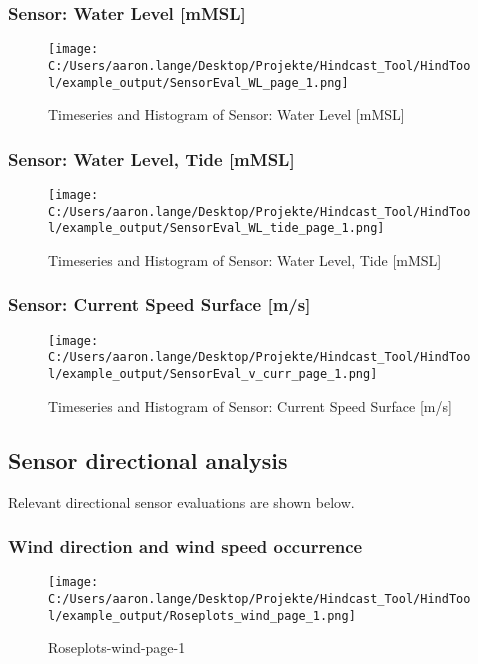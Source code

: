 \subsubsection{Sensor: Water Level [mMSL]} 
\begin{figure}[H] 
 \centering 
 \texttt{[image: C:/Users/aaron.lange/Desktop/Projekte/Hindcast\_Tool/HindTool/example\_output/SensorEval\_WL\_page\_1.png]} 
 \caption{ Timeseries and Histogram of Sensor: Water Level [mMSL] } 
 \label{fig: SensorEval_WL_page_1 } 
\end{figure}
 \clearpage
\subsubsection{Sensor: Water Level, Tide [mMSL]} 
\begin{figure}[H] 
 \centering 
 \texttt{[image: C:/Users/aaron.lange/Desktop/Projekte/Hindcast\_Tool/HindTool/example\_output/SensorEval\_WL\_tide\_page\_1.png]} 
 \caption{ Timeseries and Histogram of Sensor: Water Level, Tide [mMSL] } 
 \label{fig: SensorEval_WL_tide_page_1 } 
\end{figure}
 \clearpage
\subsubsection{Sensor: Current Speed Surface [m/s]} 
\begin{figure}[H] 
 \centering 
 \texttt{[image: C:/Users/aaron.lange/Desktop/Projekte/Hindcast\_Tool/HindTool/example\_output/SensorEval\_v\_curr\_page\_1.png]} 
 \caption{ Timeseries and Histogram of Sensor: Current Speed Surface [m/s] } 
 \label{fig: SensorEval_v_curr_page_1 } 
\end{figure}
 \clearpage

\subsection{Sensor directional analysis}
Relevant directional sensor evaluations are shown below. 

\subsubsection{Wind direction and wind speed occurrence}

\begin{figure}[H] 
 \centering 
 \texttt{[image: C:/Users/aaron.lange/Desktop/Projekte/Hindcast\_Tool/HindTool/example\_output/Roseplots\_wind\_page\_1.png]} 
 \caption{ Roseplots-wind-page-1 } 
 \label{fig: Roseplots_wind_page_1 } 
\end{figure}


